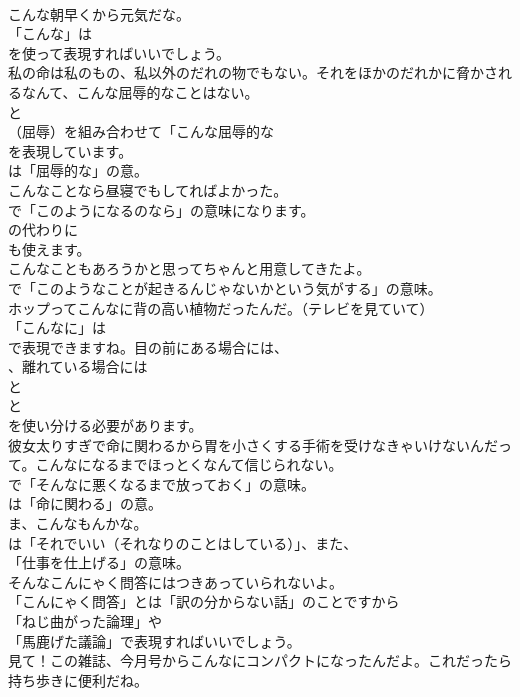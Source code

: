 \documentclass[8pt]{extreport}
\begin{document}
\begin{CJK}{UTF8}{min}
\\	こんな朝早くから元気だな。 
\\	「こんな」は
\\	を使って表現すればいいでしょう。	
\\	私の命は私のもの、私以外のだれの物でもない。それをほかのだれかに脅かされるなんて、こんな屈辱的なことはない。 
\\	と
\\	（屈辱）を組み合わせて「こんな屈辱的な 
\\	を表現しています。
\\	は「屈辱的な」の意。	
\\	こんなことなら昼寝でもしてればよかった。 
\\	で「このようになるのなら」の意味になります。
\\	の代わりに 
\\	も使えます。	
\\	こんなこともあろうかと思ってちゃんと用意してきたよ。 
\\	で「このようなことが起きるんじゃないかという気がする」の意味。	
\\	ホップってこんなに背の高い植物だったんだ。（テレビを見ていて） 
\\	「こんなに」は
\\	で表現できますね。目の前にある場合には、
\\	、離れている場合には
\\	と
\\	と
\\	を使い分ける必要があります。	
\\	彼女太りすぎで命に関わるから胃を小さくする手術を受けなきゃいけないんだって。こんなになるまでほっとくなんて信じられない。 
\\	で「そんなに悪くなるまで放っておく」の意味。
\\	は「命に関わる」の意。	
\\	ま、こんなもんかな。 
\\	は「それでいい（それなりのことはしている）」、また、
\\	「仕事を仕上げる」の意味。	
\\	そんなこんにゃく問答にはつきあっていられないよ。 
\\	「こんにゃく問答」とは「訳の分からない話」のことですから
\\	「ねじ曲がった論理」や
\\	「馬鹿げた議論」で表現すればいいでしょう。	
\\	見て！この雑誌、今月号からこんなにコンパクトになったんだよ。これだったら持ち歩きに便利だね。 

\end{CJK}
\end{document}
